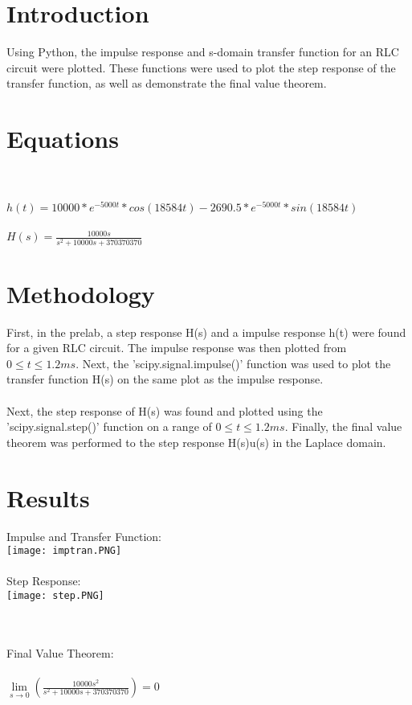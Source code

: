 \documentclass[12pt]{report}
\begin{document}
\section{Introduction}
Using Python, the impulse response and s-domain transfer function for an RLC circuit were plotted. These functions were used to plot the step response of the transfer function, as well as demonstrate the final value theorem.

\section{Equations}
\\
\\$h(t) = 10000*e^{-5000t}*cos(18584t) - 2690.5*e^{-5000t}*sin(18584t)$
\\
\\$H(s) = \frac{10000s}{s^2+10000s+370370370}$
\\

\section{Methodology}
First, in the prelab, a step response H(s) and a impulse response h(t) were found for a given RLC circuit. The impulse response was then plotted from $0\leq t \leq 1.2ms$. Next, the 'scipy.signal.impulse()' function was used to plot the transfer function H(s) on the same plot as the impulse response. 
\\ \\Next, the step response of H(s) was found and plotted using the 'scipy.signal.step()' function on a range of $0\leq t \leq 1.2ms$. Finally, the final value theorem was performed to the step response H(s)u(s) in the Laplace domain.

\section{Results}
Impulse and Transfer Function:
\\ \texttt{[image: imptran.PNG]}
\\
\\ Step Response:
\\ \texttt{[image: step.PNG]}

\\ \\Final Value Theorem: 
\\
\\$\lim\limits_{s \to 0} (\frac{10000s^2}{s^2+10000s+370370370}) = 0$
\end{document}
